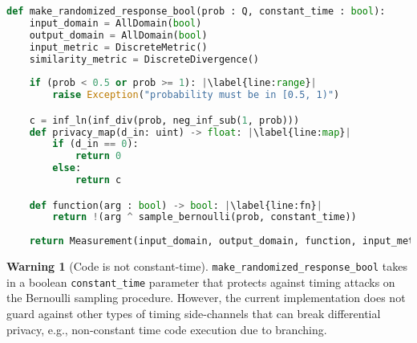 \documentclass[11pt,a4paper]{article}
\newcommand{\vicki}[1]{{ {\color{olive}{(vicki)~#1}}}}
\newcommand{\hanwen}[1]{{ {\color{purple}{(hanwen)~#1}}}}
\theoremstyle{definition}
\newtheorem{warning}{Warning}
\begin{document}
\begin{lstlisting}[language=Python, escapechar=|]
def make_randomized_response_bool(prob : Q, constant_time : bool):
    input_domain = AllDomain(bool)
    output_domain = AllDomain(bool)
    input_metric = DiscreteMetric()
    similarity_metric = DiscreteDivergence()
    
    if (prob < 0.5 or prob >= 1): |\label{line:range}|
        raise Exception("probability must be in [0.5, 1)")

    c = inf_ln(inf_div(prob, neg_inf_sub(1, prob)))
    def privacy_map(d_in: uint) -> float: |\label{line:map}|
        if (d_in == 0):
            return 0
        else: 
            return c

    def function(arg : bool) -> bool: |\label{line:fn}|
        return !(arg ^ sample_bernoulli(prob, constant_time))
    
    return Measurement(input_domain, output_domain, function, input_metric, similarity_metric, privacy_map)

\end{lstlisting}
\vicki{changed the input and return types to more generic types but maybe I should go with the ultimate generic like $Q$?}

\begin{tcolorbox}
\begin{warning}[Code is not constant-time]
 \texttt{make\_randomized\_response\_bool} takes in a boolean \texttt{constant\_time} parameter that protects against timing attacks on the Bernoulli sampling procedure. However, the current implementation does not guard against other types of timing side-channels that can break differential privacy, e.g., non-constant time code execution due to branching.
\end{warning}
\end{tcolorbox}
\end{document}
